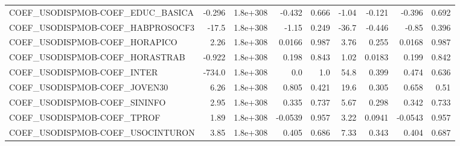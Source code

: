 \begin{tabular}{lrrrrrrrr}
COEF\_USODISPMOB-COEF\_EDUC\_BASICA  &      -0.296 &     1.8e+308 &  -0.432 &    0.666 &      -1.04 &      -0.121 &       -0.396 &         0.692 \\
COEF\_USODISPMOB-COEF\_HABPROSOCF3  &       -17.5 &     1.8e+308 &   -1.15 &    0.249 &      -36.7 &      -0.446 &        -0.85 &         0.396 \\
COEF\_USODISPMOB-COEF\_HORAPICO     &        2.26 &     1.8e+308 &  0.0166 &    0.987 &       3.76 &       0.255 &       0.0168 &         0.987 \\
COEF\_USODISPMOB-COEF\_HORASTRAB    &      -0.922 &     1.8e+308 &   0.198 &    0.843 &       1.02 &      0.0183 &        0.199 &         0.842 \\
COEF\_USODISPMOB-COEF\_INTER        &      -734.0 &     1.8e+308 &     0.0 &      1.0 &       54.8 &       0.399 &        0.474 &         0.636 \\
COEF\_USODISPMOB-COEF\_JOVEN30      &        6.26 &     1.8e+308 &   0.805 &    0.421 &       19.6 &       0.305 &        0.658 &          0.51 \\
COEF\_USODISPMOB-COEF\_SININFO      &        2.95 &     1.8e+308 &   0.335 &    0.737 &       5.67 &       0.298 &        0.342 &         0.733 \\
COEF\_USODISPMOB-COEF\_TPROF        &        1.89 &     1.8e+308 & -0.0539 &    0.957 &       3.22 &      0.0941 &      -0.0543 &         0.957 \\
COEF\_USODISPMOB-COEF\_USOCINTURON  &        3.85 &     1.8e+308 &   0.405 &    0.686 &       7.33 &       0.343 &        0.404 &         0.687 \\
\bottomrule
\end{tabular}
